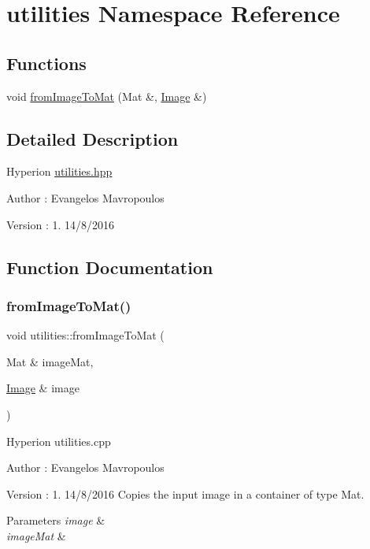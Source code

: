 \hypertarget{namespaceutilities}{}\section{utilities Namespace Reference}
\label{namespaceutilities}
\subsection*{Functions}
\begin{DoxyCompactItemize}
\item 
void \mbox{\hyperlink{namespaceutilities_a60655f0fbe101ac1d89949e25b2a7076}{from\+Image\+To\+Mat}} (Mat \&, \mbox{\hyperlink{classImage}{Image}} \&)
\end{DoxyCompactItemize}


\subsection{Detailed Description}
Hyperion \mbox{\hyperlink{utilities_8hpp_source}{utilities.\+hpp}}

\begin{DoxyAuthor}{Author}
\+: Evangelos Mavropoulos 
\end{DoxyAuthor}
\begin{DoxyVersion}{Version}
\+: 1. 14/8/2016 
\end{DoxyVersion}


\subsection{Function Documentation}
\mbox{\label{namespaceutilities_a60655f0fbe101ac1d89949e25b2a7076}} 
\subsubsection{\texorpdfstring{from\+Image\+To\+Mat()}{fromImageToMat()}}
{\footnotesize\ttfamily void utilities\+::from\+Image\+To\+Mat (\begin{DoxyParamCaption}\item[{Mat \&}]{image\+Mat,  }\item[{\mbox{\hyperlink{classImage}{Image}} \&}]{image }\end{DoxyParamCaption})}

Hyperion utilities.\+cpp

\begin{DoxyAuthor}{Author}
\+: Evangelos Mavropoulos 
\end{DoxyAuthor}
\begin{DoxyVersion}{Version}
\+: 1. 14/8/2016 Copies the input image in a container of type Mat.
\end{DoxyVersion}

\begin{DoxyParams}{Parameters}
{\em image} & \\
\hline
{\em image\+Mat} & \\
\hline
\end{DoxyParams}
